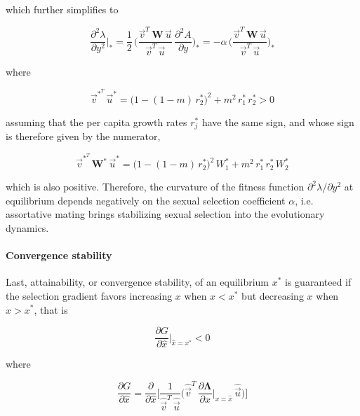 which further simplifies to

\begin{equation}
    \frac{\partial^2 \lambda}{\partial y^2}\bigg|_* = \frac{1}{2}\,\Bigg(\frac{\overrightarrow{v}^T\,\pmb W\,\overrightarrow{u}}{\overrightarrow{v}^T\,\overrightarrow{u}}\,\frac{\partial^2 A}{\partial y}\Bigg)_* = -\alpha \, \Bigg(\frac{\overrightarrow{v}^T\,\pmb W\,\overrightarrow{u}}{\overrightarrow{v}^T\,\overrightarrow{u}}\Bigg)_*
    \label{eq:curvature_final}
\end{equation}

where 

\begin{equation}
    \overrightarrow{v}^*^T\,\overrightarrow{u}^* = \big(1-(1-m)\,r^*_2\big)^2 + m^2\,r^*_1\,r^*_2 > 0
\end{equation}

assuming that the per capita growth rates $r^*_j$ have the same sign, and whose sign is therefore given by the numerator,

\begin{equation}
    \overrightarrow{v}^*^T\,\pmb W^*\,\overrightarrow{u}^* = \big(1-(1-m)\,r^*_2\big)^2\,W^*_1 + m^2\,r^*_1\,r^*_2\,W^*_2
\end{equation}

which is also positive. Therefore, the curvature of the fitness function $\partial^2 \lambda / \partial y^2$ at equilibrium depends negatively on the sexual selection coefficient $\alpha$, i.e. assortative mating brings stabilizing sexual selection into the evolutionary dynamics.

\paragraph{Convergence stability} Last, attainability, or convergence stability, of an equilibrium $x^*$ is guaranteed if the selection gradient favors increasing $x$ when $x < x^*$ but decreasing $x$ when $x > x^*$, that is

\begin{equation}
    \frac{\partial G}{\partial \hat{x}}\bigg|_{\hat{x}=x^*} < 0
\end{equation}

where 

\begin{equation}
    \frac{\partial G}{\partial \hat{x}} = \frac{\partial}{\partial \hat{x}} \Bigg[ \frac{1}{\hat{\overrightarrow{v}}^T\,\hat{\overrightarrow{u}}} \bigg( \hat{\overrightarrow{v}}^T\,\frac{\partial \pmb{\Lambda}}{\partial x}\bigg|_{x=\hat{x}}\,\hat{\overrightarrow{u}} \bigg) \Bigg]
\end{equation}

